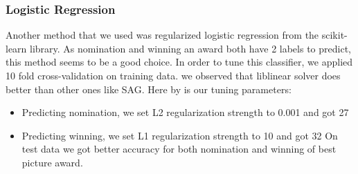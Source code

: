 \documentclass[journal,transmag]{IEEEtran}
\begin{document}
			\subsubsection{Logistic Regression}
			Another method that we used was regularized logistic regression from the scikit-learn library. As nomination and winning an award both have 2 labels to predict, this method seems to be a good choice. In order to tune this classifier, we applied 10 fold cross-validation on training data. we observed that liblinear solver does better than other ones like SAG. Here by is our tuning parameters:
			\begin{itemize}
				\item Predicting nomination, we set L2 regularization strength to 0.001 and got 27%
				\item Predicting winning, we set L1 regularization strength to 10 and got 32%
				On test data we got better accuracy for both nomination and winning of best picture award.
			\end{itemize}
			
			
\end{document}
